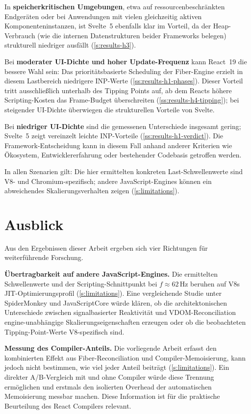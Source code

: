 \noindent In \textbf{speicherkritischen Umgebungen}, etwa auf ressourcenbeschränkten Endgeräten oder bei Anwendungen mit vielen gleichzeitig aktiven Komponenteninstanzen, ist Svelte~5 ebenfalls klar im Vorteil, da der Heap-Verbrauch (wie die internen Datenstrukturen beider Frameworks belegen) strukturell niedriger ausfällt (\cref{s:results-h3}).

\noindent Bei \textbf{moderater UI-Dichte und hoher Update-Frequenz} kann React~19 die bessere Wahl sein: Das prioritätsbasierte Scheduling der Fiber-Engine erzielt in diesem Lastbereich niedrigere INP-Werte (\cref{ss:results-h1-phases}). Dieser Vorteil tritt ausschließlich unterhalb des Tipping Points auf, ab dem Reacts höhere Scripting-Kosten das Frame-Budget überschreiten (\cref{ss:results-h4-tipping}); bei steigender UI-Dichte überwiegen die strukturellen Vorteile von Svelte.

\noindent Bei \textbf{niedriger UI-Dichte} sind die gemessenen Unterschiede insgesamt gering; Svelte~5 zeigt vereinzelt leichte INP-Vorteile (\cref{ss:results-h1-verdict}). Die Framework-Entscheidung kann in diesem Fall anhand anderer Kriterien wie Ökosystem, Entwicklererfahrung oder bestehender Codebasis getroffen werden.

\noindent In allen Szenarien gilt: Die hier ermittelten konkreten Last-Schwellenwerte sind V8- und Chromium-spezifisch; andere JavaScript-Engines können ein abweichendes Skalierungsverhalten zeigen (\cref{s:limitations}).

\section{Ausblick}
\label{s:fazit-ausblick}

Aus den Ergebnissen dieser Arbeit ergeben sich vier Richtungen für weiterführende Forschung.

\noindent\textbf{Übertragbarkeit auf andere JavaScript-Engines.} Die ermittelten Schwellenwerte und der Scripting-Schnittpunkt bei $f \approx 62\,\text{Hz}$ beruhen auf V8s JIT-Optimierungsprofil (\cref{s:limitations}). Eine vergleichende Studie unter SpiderMonkey und JavaScriptCore würde klären, ob die architektonischen Unterschiede zwischen signalbasierter Reaktivität und VDOM-Reconciliation engine-unabhängige Skalierungseigenschaften erzeugen oder ob die beobachteten Tipping-Point-Werte V8-spezifisch sind.

\noindent\textbf{Messung des Compiler-Anteils.} Die vorliegende Arbeit erfasst den kombinierten Effekt aus Fiber-Reconciliation und Compiler-Memoisierung, kann jedoch nicht bestimmen, wie viel jeder Anteil beiträgt (\cref{s:limitations}). Ein direkter A/B-Vergleich mit und ohne Compiler würde diese Trennung ermöglichen und erstmals den isolierten Overhead der automatischen Memoisierung messbar machen. Diese Information ist für die praktische Beurteilung des React Compilers relevant.

